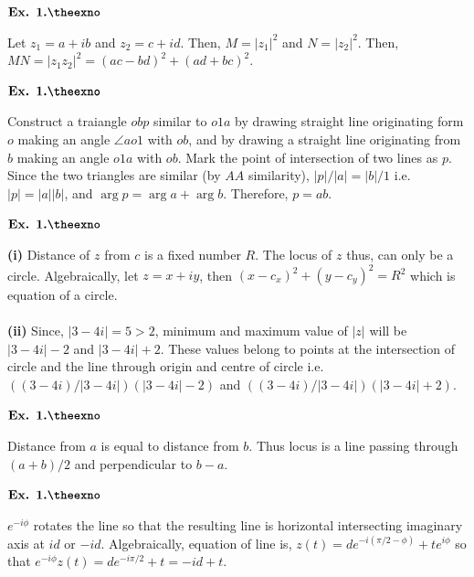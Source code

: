 \documentclass{article}
\def\tf{\textbf}
\newcounter{exno}
\begin{document}
\vspace{0.2in}

${\textbf{Ex. 1.\theexno}}$
\addtocounter{exno}{1}

Let $z_1=a+ib$ and $z_2=c+id$. Then, $M=|z_1|^2$ and $N=|z_2|^2$. Then, $MN = |z_1z_2|^2 = (ac-bd)^2 + (ad+bc)^2$.

\vspace{0.2in}

${\textbf{Ex. 1.\theexno}}$
\addtocounter{exno}{1}

Construct a traiangle $obp$ similar to $o1a$ by drawing straight line originating form $o$ making an angle $\angle ao1$ with $ob$, and by drawing a straight line originating from $b$ making an angle $o1a$ with $ob$. Mark the point of intersection of two lines as $p$. Since the two triangles are similar (by $AA$ similarity), $|p|/|a| = |b|/1$ i.e. $|p|=|a||b|$, and $\arg p = \arg a + \arg b$. Therefore,  $p = ab$.

\vspace{0.2in}

${\textbf{Ex. 1.\theexno}}$
\addtocounter{exno}{1}

\tf{(i)} Distance of $z$ from $c$ is a fixed number $R$. The locus of $z$ thus, can only be a circle. Algebraically, let $z=x+iy$, then $(x-c_x)^2+(y-c_y)^2 = R^2$ which is equation of a circle.\\~\\

\tf{(ii)} Since, $|3-4i|=5>2$, minimum and maximum value of $|z|$ will be $|3-4i|-2$ and $|3-4i|+2$. These values belong to points at the intersection of circle and the line through origin and centre of circle i.e. $((3-4i)/|3-4i|)(|3-4i|-2)$ and $((3-4i)/|3-4i|)(|3-4i|+2)$.

\vspace{0.2in}

${\textbf{Ex. 1.\theexno}}$
\addtocounter{exno}{1}

Distance from $a$ is equal to distance from $b$. Thus locus is a line passing through $(a+b)/2$ and perpendicular to $b-a$.

\vspace{0.2in}

${\textbf{Ex. 1.\theexno}}$
\addtocounter{exno}{1}

$e^{-i\phi}$ rotates the line so that the resulting line is horizontal intersecting imaginary axis at $id$ or $-id$. Algebraically, equation of line is, $z(t) = de^{-i(\pi/2-\phi)} +te^{i\phi}$ so that $e^{-i\phi}z(t) = de^{-i\pi/2}+t = -id + t$.
\end{document}
